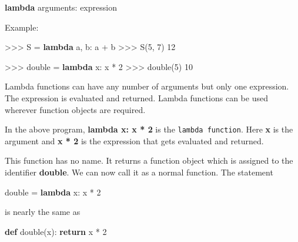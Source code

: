 \documentclass[11pt]{article}
\newenvironment{Shaded}{}{}
\newcommand{\KeywordTok}[1]{\textcolor[rgb]{0.00,0.44,0.13}{\textbf{{#1}}}}
\newcommand{\DecValTok}[1]{\textcolor[rgb]{0.25,0.63,0.44}{{#1}}}
\newcommand{\NormalTok}[1]{{#1}}
\newcommand{\ControlFlowTok}[1]{\textcolor[rgb]{0.00,0.44,0.13}{\textbf{{#1}}}}
\newcommand{\OperatorTok}[1]{\textcolor[rgb]{0.40,0.40,0.40}{{#1}}}
\begin{document}
\begin{Shaded}
\begin{Highlighting}[]
\KeywordTok{lambda}\NormalTok{ arguments: expression}
\end{Highlighting}
\end{Shaded}

Example:

\begin{Shaded}
\begin{Highlighting}[]
\OperatorTok{>>>}\NormalTok{ S }\OperatorTok{=} \KeywordTok{lambda}\NormalTok{ a, b: a }\OperatorTok{+}\NormalTok{ b}
\OperatorTok{>>>}\NormalTok{ S(}\DecValTok{5}\NormalTok{, }\DecValTok{7}\NormalTok{)}
    \DecValTok{12}
\end{Highlighting}
\end{Shaded}

\begin{Shaded}
\begin{Highlighting}[]
\OperatorTok{>>>}\NormalTok{ double }\OperatorTok{=} \KeywordTok{lambda}\NormalTok{ x: x }\OperatorTok{*} \DecValTok{2}
\OperatorTok{>>>}\NormalTok{ double(}\DecValTok{5}\NormalTok{)}
    \DecValTok{10}
\end{Highlighting}
\end{Shaded}

Lambda functions can have any number of arguments but only one
expression. The expression is evaluated and returned. Lambda functions
can be used wherever function objects are required.

In the above program, \textbf{lambda x: x * 2} is the
\texttt{lambda\ function}. Here \textbf{x} is the argument and \textbf{x
* 2} is the expression that gets evaluated and returned.

This function has no name. It returns a function object which is
assigned to the identifier \textbf{double}. We can now call it as a
normal function. The statement

\begin{Shaded}
\begin{Highlighting}[]
\NormalTok{double }\OperatorTok{=} \KeywordTok{lambda}\NormalTok{ x: x }\OperatorTok{*} \DecValTok{2}
\end{Highlighting}
\end{Shaded}

is nearly the same as

\begin{Shaded}
\begin{Highlighting}[]
\KeywordTok{def}\NormalTok{ double(x):}
    \ControlFlowTok{return}\NormalTok{ x }\OperatorTok{*} \DecValTok{2}
\end{Highlighting}
\end{Shaded}
\end{document}
